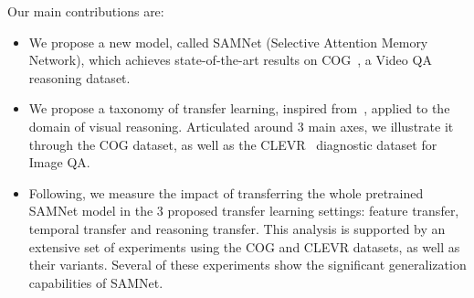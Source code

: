 Our main contributions are:
\begin{itemize}
	\compresslist
	\item We propose a new model, called SAMNet (Selective Attention Memory Network), which achieves state-of-the-art results on COG~\cite{yang2018dataset}, a Video QA reasoning dataset.
	\item We propose a taxonomy of transfer learning, inspired from~\cite{pan2009survey}, applied to the domain of visual reasoning. Articulated around 3 main axes, we illustrate it through the COG dataset, as well as the CLEVR~\cite{johnson2017clevr} diagnostic dataset for Image QA.
	\item Following, we measure the impact of transferring the whole pretrained SAMNet model in the 3 proposed transfer learning settings: feature transfer, temporal transfer and reasoning transfer. This analysis is supported by an extensive set of experiments using the COG and CLEVR datasets, as well as their variants. Several of these experiments show the significant generalization capabilities of SAMNet.
\end{itemize}